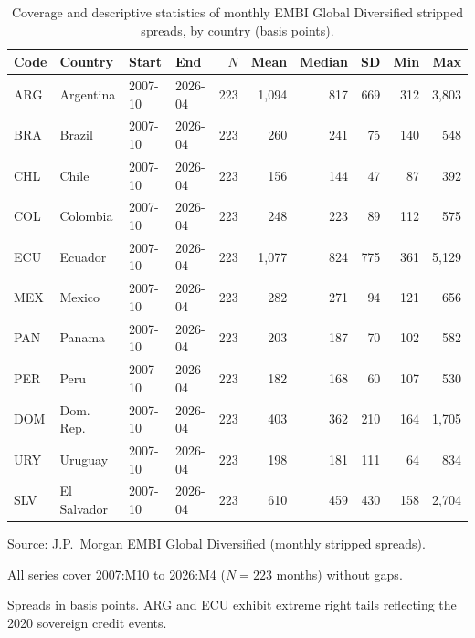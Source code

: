 \begin{table}[!htbp]
\centering
\footnotesize
\begin{threeparttable}
\caption{Coverage and descriptive statistics of monthly EMBI Global Diversified stripped spreads, by country (basis points).}
\label{tab:data_coverage}
\begin{tabular}{llllrrrrrr}
\toprule
Code & Country & Start & End & $N$ & Mean & Median & SD & Min & Max \\
\midrule
ARG & Argentina & 2007-10 & 2026-04 & 223 & 1,094 & 817 & 669 & 312 & 3,803 \\
BRA & Brazil & 2007-10 & 2026-04 & 223 & 260 & 241 & 75 & 140 & 548 \\
CHL & Chile & 2007-10 & 2026-04 & 223 & 156 & 144 & 47 & 87 & 392 \\
COL & Colombia & 2007-10 & 2026-04 & 223 & 248 & 223 & 89 & 112 & 575 \\
ECU & Ecuador & 2007-10 & 2026-04 & 223 & 1,077 & 824 & 775 & 361 & 5,129 \\
MEX & Mexico & 2007-10 & 2026-04 & 223 & 282 & 271 & 94 & 121 & 656 \\
PAN & Panama & 2007-10 & 2026-04 & 223 & 203 & 187 & 70 & 102 & 582 \\
PER & Peru & 2007-10 & 2026-04 & 223 & 182 & 168 & 60 & 107 & 530 \\
DOM & Dom. Rep. & 2007-10 & 2026-04 & 223 & 403 & 362 & 210 & 164 & 1,705 \\
URY & Uruguay & 2007-10 & 2026-04 & 223 & 198 & 181 & 111 & 64 & 834 \\
SLV & El Salvador & 2007-10 & 2026-04 & 223 & 610 & 459 & 430 & 158 & 2,704 \\
\bottomrule
\end{tabular}
\begin{tablenotes}\footnotesize
\item Source: J.P.~Morgan EMBI Global Diversified (monthly stripped spreads).
\item All series cover 2007:M10 to 2026:M4 ($N=223$ months) without gaps.
\item Spreads in basis points. ARG and ECU exhibit extreme right tails reflecting the 2020 sovereign credit events.
\end{tablenotes}
\end{threeparttable}
\end{table}
